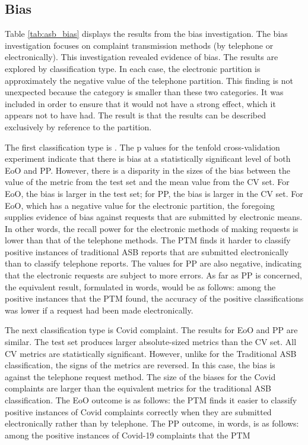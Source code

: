 \subsection{Bias} 

Table \ref{tab:asb_bias} displays the results from the bias investigation. The bias investigation focuses on complaint transmission methods (by telephone or electronically). This investigation revealed evidence of bias. The results are explored by classification type. In each case, the electronic partition is approximately the negative value of the telephone partition. This finding is not unexpected because the  category is smaller than these two categories. It was included in order to ensure that it would not have a strong effect, which it appears not to have had. The result is that the results can be described exclusively by reference to the  partition.

The first classification type is . The p values for the tenfold cross-validation experiment indicate that there is bias at a statistically significant level of both EoO and PP. However, there is a disparity in the sizes of the bias between the value of the metric from the test set and the mean value from the CV set. For EoO, the bias is larger in the test set; for PP, the bias is larger in the CV set. For EoO, which has a negative value for the electronic partition, the foregoing supplies evidence of bias against requests that are submitted by electronic means. In other words, the recall power for the electronic methods of making requests is lower than that of the telephone methods. The PTM finds it harder to classify positive instances of traditional ASB reports that are submitted electronically than to classify telephone reports. The values for PP are also negative, indicating that the electronic requests are subject to more errors. As far as PP is concerned, the equivalent result, formulated in words, would be as follows: among the positive instances that the PTM found, the accuracy of the positive classifications was lower if a request had been made electronically.

The next classification type is Covid complaint. The results for EoO and PP are similar. The test set produces larger absolute-sized metrics than the CV set. All CV metrics are statistically significant. However, unlike for the Traditional ASB classification, the signs of the metrics are reversed. In this case, the bias is against the telephone request method. The size of the biases for the Covid complaints are larger than the equivalent metrics for the traditional ASB classification. The EoO outcome is as follows: the PTM finds it easier to classify positive instances of Covid complaints correctly when they are submitted electronically rather than by telephone. The PP outcome, in words, is as follows: among the positive instances of Covid-19 complaints that the PTM 

